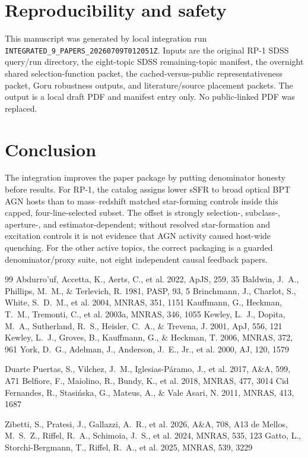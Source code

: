 \documentclass[twocolumn]{aastex702}
\begin{document}
\section{Reproducibility and safety}\label{sec:repro}
This manuscript was generated by local integration run \texttt{INTEGRATED\_9\_PAPERS\_20260709T012051Z}. Inputs are the original RP-1 SDSS query/run directory, the eight-topic SDSS remaining-topic manifest, the overnight shared selection-function packet, the cached-versus-public representativeness packet, Goru robustness outputs, and literature/source placement packets. The output is a local draft PDF and manifest entry only. No public-linked PDF was replaced.

\section{Conclusion}\label{sec:conclusion}
The integration improves the paper package by putting denominator honesty before results. For RP-1, the catalog assigns lower sSFR to broad optical BPT AGN hosts than to mass--redshift matched star-forming controls inside this capped, four-line-selected subset. The offset is strongly selection-, subclass-, aperture-, and estimator-dependent; without resolved star-formation and excitation controls it is not evidence that AGN activity caused host-wide quenching. For the other active topics, the correct packaging is a guarded denominator/proxy suite, not eight independent causal feedback papers.


\begin{thebibliography}{99}
 Abdurro'uf, Accetta, K., Aerts, C., et al. 2022, ApJS, 259, 35
 Baldwin, J.~A., Phillips, M.~M., \& Terlevich, R. 1981, PASP, 93, 5
 Brinchmann, J., Charlot, S., White, S.~D.~M., et al. 2004, MNRAS, 351, 1151
 Kauffmann, G., Heckman, T.~M., Tremonti, C., et al. 2003a, MNRAS, 346, 1055
 Kewley, L.~J., Dopita, M.~A., Sutherland, R.~S., Heisler, C.~A., \& Trevena, J. 2001, ApJ, 556, 121
 Kewley, L.~J., Groves, B., Kauffmann, G., \& Heckman, T. 2006, MNRAS, 372, 961
 York, D.~G., Adelman, J., Anderson, J.~E., Jr., et al. 2000, AJ, 120, 1579


 Duarte Puertas, S., Vilchez, J.~M., Iglesias-Páramo, J., et al. 2017, A\&A, 599, A71
 Belfiore, F., Maiolino, R., Bundy, K., et al. 2018, MNRAS, 477, 3014
 Cid Fernandes, R., Stasińska, G., Mateus, A., \& Vale Asari, N. 2011, MNRAS, 413, 1687

 Zibetti, S., Pratesi, J., Gallazzi, A.~R., et al. 2026, A\&A, 708, A13
 de Mellos, M.~S.~Z., Riffel, R.~A., Schimoia, J.~S., et al. 2024, MNRAS, 535, 123
 Gatto, L., Storchi-Bergmann, T., Riffel, R.~A., et al. 2025, MNRAS, 539, 3229
\end{thebibliography}
\end{document}
